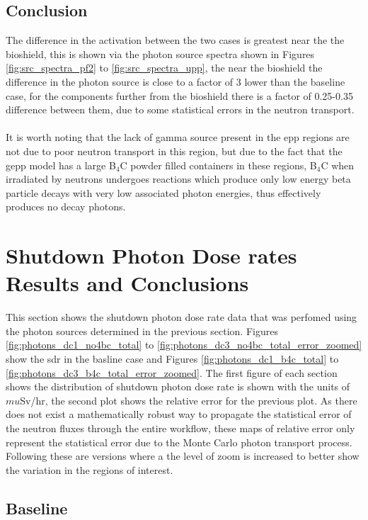 \documentclass[12pt]{article}
\begin{document}
\newpage
\clearpage

\subsection{Conclusion}
The difference in the activation between the two cases is greatest near the 
the bioshield, this is shown via the photon source spectra shown in Figures
\ref{fig:src_spectra_pf2} to \ref{fig:src_spectra_upp}, the near the bioshield
the difference in the photon source is close to a factor of 3 lower than the 
baseline case, for the components further from the bioshield there is a factor
of 0.25-0.35 difference between them, due to some statistical errors in the 
neutron transport. 
\\
\\
It is worth noting that the lack of gamma source present in the \gls{epp}
regions are not due to poor neutron transport in this region, but due to the
fact that the \gls{gepp} model has a large B$_4$C powder filled containers
in these regions, B$_4$C when irradiated by neutrons undergoes reactions
which produce only low energy beta particle decays with very low associated
photon energies, thus effectively produces no decay photons.

\newpage
\clearpage
\section{Shutdown Photon Dose rates Results and Conclusions}
\label{section:sdr_conc}
This section shows the shutdown photon dose rate data that was perfomed using
the photon sources determined in the previous section. Figures \ref{fig:photons_dc1_no4bc_total}
to \ref{fig:photons_dc3_no4bc_total_error_zoomed} show the \gls{sdr} in the basline case 
and Figures \ref{fig:photons_dc1_b4c_total} to \ref{fig:photons_dc3_b4c_total_error_zoomed}. 
The first figure of each section shows the distribution of shutdown photon dose rate is shown 
with the units of $mu$Sv/hr, the second plot shows the relative error for the previous plot. 
As there does not exist a mathematically robust way to propagate the statistical error of the
neutron fluxes through the entire workflow, these maps of relative error only represent the 
statistical error due to the Monte Carlo photon transport process. Following
these are versions where a the level of zoom is increased to better show the variation in the regions
of interest.

\subsection{Baseline}
\end{document}
